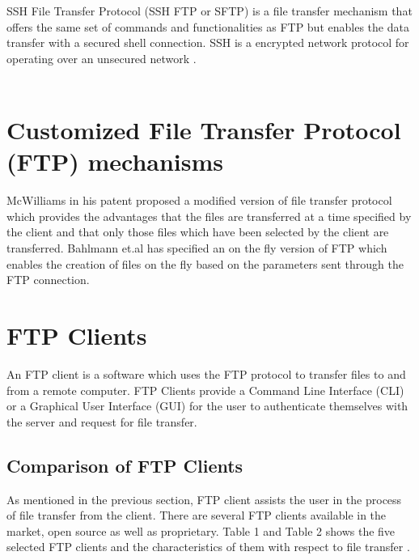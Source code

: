 \documentclass[9pt,twocolumn,twoside]{styles/osajnl}
\begin{document}
SSH File Transfer Protocol (SSH FTP or SFTP) \cite{www-wiki-sftp} is a file transfer mechanism that offers the same set of commands and functionalities as FTP but enables the data transfer with a secured shell connection. SSH is a encrypted network protocol for operating over an unsecured network \cite{www-wiki-ssh}. \\\\

\section{Customized File Transfer Protocol (FTP) mechanisms}

McWilliams in his patent \cite{mcwilliams2001high} proposed a modified version of file transfer protocol which provides the advantages that the files are transferred at a time specified by the client and that only those files which have been selected by the client are transferred. Bahlmann et.al  has specified an on the fly version of FTP \cite{bahlmann2001fly} which enables the creation of files on the fly based on the parameters sent through the FTP connection.

\section{FTP Clients}
An FTP client is a software which uses the FTP protocol to transfer files to and from a remote computer. FTP Clients provide a Command Line Interface (CLI) or a Graphical User Interface (GUI) for the user to authenticate themselves with the server and request for file transfer.
\subsection{Comparison of FTP Clients}
As mentioned in the previous section, FTP client assists the user in the process of file transfer from the client. There are several FTP clients available in the market, open source as well as proprietary. Table 1 and Table 2 shows the five selected FTP clients and the characteristics of them with respect to file transfer \cite{www-wiki-ftpclientcomp}.
\end{document}
